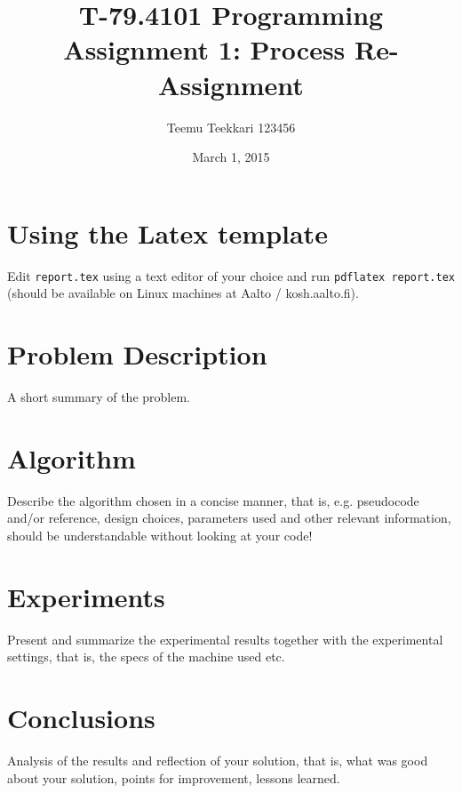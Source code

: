 \documentclass[11pt]{article}   %
\begin{document}
\title{T-79.4101 Programming Assignment 1: Process Re-Assignment}   
\author{Teemu Teekkari 123456}  %
\date{March 1, 2015}            %
\maketitle

\section{Using the Latex template}    

Edit {\tt report.tex} using a text editor of your choice 
and run {\tt pdflatex report.tex} (should be available on Linux
machines at Aalto / kosh.aalto.fi).


\section{Problem Description}    

A short summary of the problem.

\section{Algorithm}       

Describe the algorithm chosen in a concise manner, that is, e.g.
pseudocode and/or reference, design choices, parameters used and other
relevant information, should be understandable without looking at your code!

\section{Experiments}   

Present and summarize the experimental results together with the 
experimental settings, that is, the specs of the machine used etc.
 
\section{Conclusions}         

Analysis of the results and reflection of your solution, that is, 
what was good about your solution, points for improvement, lessons 
learned.


\end{document}

